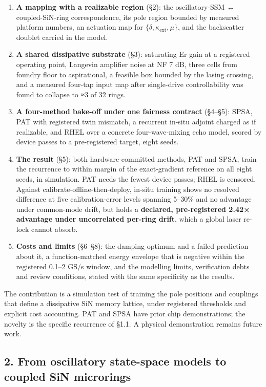 \documentclass[
  10pt,
]{article}
\providecommand{\tightlist}{%
  \setlength{\itemsep}{0pt}\setlength{\parskip}{0pt}}
\begin{document}
\begin{enumerate}
\def\labelenumi{\arabic{enumi}.}
\tightlist
\item
  \textbf{A mapping with a realizable region} (§2): the oscillatory-SSM
  ↔ coupled-SiN-ring correspondence, its pole region bounded by measured
  platform numbers, an actuation map for
  \(\{\delta, \kappa_\text{ext}, \mu\}\), and the backscatter doublet
  carried in the model.
\item
  \textbf{A shared dissipative substrate} (§3): saturating Er gain at a
  registered operating point, Langevin amplifier noise at NF 7 dB, three
  cells from foundry floor to aspirational, a feasible box bounded by
  the lasing crossing, and a measured four-tap input map after
  single-drive controllability was found to collapse to ≈3 of 32 rings.
\item
  \textbf{A four-method bake-off under one fairness contract} (§4--§5):
  SPSA, PAT with registered twin mismatch, a recurrent in-situ adjoint
  charged as if realizable, and RHEL over a concrete four-wave-mixing
  echo model, scored by device passes to a pre-registered target, eight
  seeds.
\item
  \textbf{The result} (§5): both hardware-committed methods, PAT and
  SPSA, train the recurrence to within margin of the exact-gradient
  reference on all eight seeds, in simulation. PAT needs the fewest
  device passes; RHEL is censored. Against
  calibrate-offline-then-deploy, in-situ training shows no resolved
  difference at five calibration-error levels spanning 5--30\% and no
  advantage under common-mode drift, but holds a \textbf{declared,
  pre-registered 2.42× advantage under uncorrelated per-ring drift},
  which a global laser re-lock cannot absorb.
\item
  \textbf{Costs and limits} (§6--§8): the damping optimum and a failed
  prediction about it, a function-matched energy envelope that is
  negative within the registered 0.1--2 GS/s window, and the modelling
  limits, verification debts and review conditions, stated with the same
  specificity as the results.
\end{enumerate}

The contribution is a simulation test of training the pole positions and
couplings that define a dissipative SiN memory lattice, under registered
thresholds and explicit cost accounting. PAT and SPSA have prior chip
demonstrations; the novelty is the specific recurrence of §1.1. A
physical demonstration remains future work.

\subsection{2. From oscillatory state-space models to coupled SiN
microrings}\label{from-oscillatory-state-space-models-to-coupled-sin-microrings}
\end{document}
